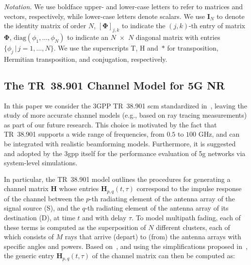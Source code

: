 \emph{Notation.} We use boldface upper- and lower-case letters to refer to matrices and vectors, respectively, while lower-case letters denote scalars. We use $\bm{I}_{N}$ to denote the identity matrix of order $N$, $[ \bm{\Phi} ]_{j, k}$ to indicate the $(j, k)$-th
entry of matrix $\bm{\Phi}$, $\mathrm{diag} ( \phi_1,\dots, \phi_N) $ to indicate an  $N$~$\times$~$N$ diagonal matrix with entries $\{\phi_j \, | \, j=1, \dots, N \}$. We use the superscripts T, H and~$*$ for transposition, Hermitian transposition, and conjugation, respectively.





\subsection{The TR~38.901 Channel Model for 5G NR}
 \label{sec:baseline_model}

In this paper we consider the 3GPP TR~38.901 \gls{scm} standardized in~\cite{3gpp.38.901}, leaving the study of more accurate channel models (e.g., based on ray tracing measurements) as part of our future research.
This choice is motivated by the fact that TR~38.901 supports a wide range of frequencies, from $0.5$ to $100$ GHz, and can be integrated with realistic beamforming models. Furthermore, it is suggested and adopted by the \gls{3gpp} itself for the performance evaluation of \gls{5g} networks via system-level simulations.

In particular, the TR~38.901 model outlines the procedures for generating a channel matrix $\bm{H}$ whose entries $\bm{H}_{p, q} (t, \tau)$ correspond to the impulse response of the channel between the $p$-th radiating element of the antenna array of the signal source (S), and the $q$-th radiating element of the antenna array of its destination (D), at time $t$ and with delay $\tau$. 
To model multipath fading, each of these terms is computed as the superposition of $N$ different clusters, each of which consists of $M$ rays that arrive (depart) to (from) the antenna arrays with specific angles and powers. Based on~\cite{3gpp.38.901}, and using the simplifications proposed in~\cite{zugno2020implementation}, the generic entry $\bm{H}_{p, q} (t, \tau)$ of the channel matrix can then be computed as:

